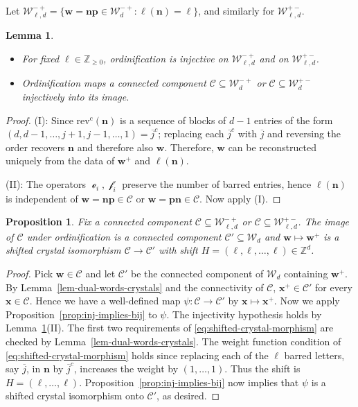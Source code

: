 \documentclass[12pt]{amsart}
\newcommand{\bs}{\boldsymbol}
\DeclareMathOperator{\worde}{{\mathcal e}}
\DeclareMathOperator{\wordf}{{\mathcal f}}
\newtheorem{lemma}[theorem]{Lemma}
\newtheorem{proposition}[theorem]{Proposition}
\theoremstyle{definition}
\theoremstyle{remark}
\newcommand{\barindex}[1]{\overline{#1}}
\begin{document}
Let 
${\mathcal W}_{\ell,d}^{-+}=\{{\bs w}={\bs n}{\bs p}\in {\mathcal W}_d^{-+}: \ell({\bs n})=\ell\}$, 
and similarly for ${\mathcal W}_{\ell,d}^{+-}$. 
\begin{lemma}\label{lemma:May13aaa}
\begin{itemize}
\item[(I)]
For fixed $\ell\in {\mathbb Z}_{\geq 0}$, ordinification is injective on
${\mathcal W}_{\ell,d}^{-+}$ and on ${\mathcal W}_{\ell,d}^{+-}$.
\item[(II)] Ordinification maps a connected component ${\mathcal C}\subseteq 
{\mathcal W}_d^{-+}$ or ${\mathcal C}\subseteq {\mathcal W}_d^{+-}$ injectively into its image.
\end{itemize}
\end{lemma}
\begin{proof}
(I): Since $\operatorname{rev^c}({\bs n})$ 
is a sequence of blocks of $d-1$ entries of the form $(d,d-1,\ldots,j+1,j-1,\ldots,1) = \barindex{j}^c$; replacing each $
\barindex{j}^c$ with $\barindex{j}$ and reversing the order recovers ${\bs n}$ and therefore also ${\bs w}$. 
Therefore, ${\bs w}$ can be reconstructed uniquely from the data of ${\bs w^+}$ and $\ell({\bs n})$. 

(II): The operators $\worde_i,\wordf_i$ preserve the number of barred entries, hence
 $\ell({\bs n})$ is independent of ${\bs w}={\bs n}{\bs p}\in {\mathcal C}$ or ${\bs w}={\bs p}{\bs n}\in {\mathcal C}$. Now apply
(I).
\end{proof}

\begin{proposition} \label{prop:ordinification-isomorphism}
Fix a connected component ${\mathcal C}\subseteq {\mathcal W}_{\ell,d}^{-+}$ or 
${\mathcal C}\subseteq {\mathcal W}_{\ell,d}^{+-}$. The image of ${\mathcal C}$ 
under ordinification is
a connected component ${\mathcal C}'\subseteq {\mathcal W}_d$ and
${\bs w}\mapsto {\bs w}^+$ is a shifted crystal isomorphism
${\mathcal C}\to {\mathcal C}'$ with shift
$H=(\ell,\ell,\ldots,\ell)\in{\mathbb Z}^d$.
 \end{proposition}
 \begin{proof}
Pick ${\bs w}\in {\mathcal C}$ and let ${\mathcal C}'$ be the connected component of 
${\mathcal W}_d$ containing ${\bs w}^+$. By Lemma~\ref{lem-dual-words-crystals} and
the connectivity of ${\mathcal C}$, ${\bs x}^+\in {\mathcal C}'$ for every ${\bs x}\in {\mathcal C}$.
Hence we have a well-defined map $\psi:{\mathcal C}\to{\mathcal C}'$ by ${\bs x}\mapsto {\bs x}^+$. 
Now we apply Proposition~\ref{prop:inj-implies-bij} to $\psi$.
The injectivity hypothesis holds by
Lemma~\ref{lemma:May13aaa}(II). The first two requirements of \eqref{eq:shifted-crystal-morphism}
are checked by Lemma~\ref{lem-dual-words-crystals}. The weight function condition of
\eqref{eq:shifted-crystal-morphism} holds since
replacing each of the $\ell$ barred letters, say $\barindex{j}$, in
${\bs n}$ by $\barindex{j}^c$, increases the weight by $(1,\ldots,1)$.
Thus the shift is $H=(\ell,\ldots,\ell)$.
Proposition~\ref{prop:inj-implies-bij} now implies that $\psi$ is a
shifted crystal isomorphism onto ${\mathcal C}'$, as desired.
\end{proof}
\end{document}

